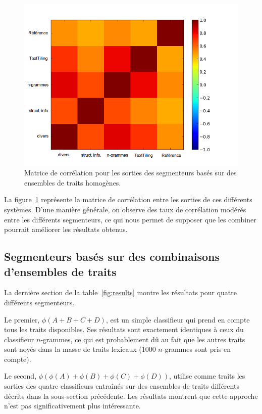 \begin{figure}[!ht]
	\centering
	\includegraphics[width=.85\textwidth]{img/correlation.png}
	\caption{Matrice de corrélation pour les sorties des segmenteurs basés sur des ensembles de traits homogènes.}
	\label{fig:correlation}
\end{figure}

La figure~\ref{fig:correlation} représente la matrice de corrélation entre les sorties de ces différents systèmes. D'une manière générale, on observe des taux de corrélation modérés entre les différents segmenteurs, ce qui nous permet de supposer que les combiner pourrait améliorer les résultats obtenus.

\subsection{Segmenteurs basés sur des combinaisons d'ensembles de traits}

La dernière section de la table~\ref{fig:results} montre les résultats pour quatre différents segmenteurs. 

Le premier, $\phi(A + B + C + D)$, est un simple classifieur qui prend en compte tous les traits disponibles. Ses résultats sont exactement identiques à ceux du classifieur $n$-grammes, ce qui est probablement dû au fait que les autres traits sont noyés dans la masse de traits lexicaux (1000 $n$-grammes sont pris en compte). 

Le second, $\phi(\phi(A) + \phi(B) + \phi(C) + \phi(D))$, utilise comme traits les sorties des quatre classifieurs entraînés sur des ensembles de traits différents décrits dans la sous-section précédente. Les résultats montrent que cette approche n'est pas significativement plus intéressante. 

